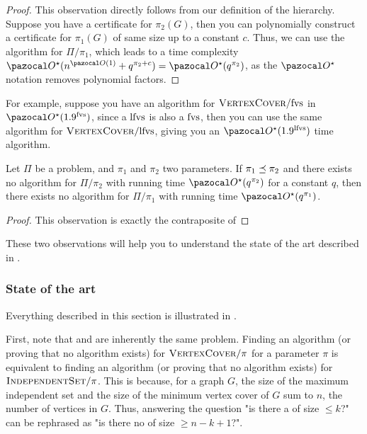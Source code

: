 \begin{proof}
    This observation directly follows from our definition of the hierarchy. Suppose you have a certificate for $\pi_2(G)$, then you can polynomially construct a certificate for $\pi_1(G)$ of same size up to a constant $c$. Thus, we can use the algorithm for $\Pi/\pi_1$, which leads to a time complexity $\O^\star(n^{\O(1)} + q^{\pi_2 + c}) = \O^\star(q^{\pi_2})$, as the $\O^\star$ notation removes polynomial factors. 
\end{proof}

For example, suppose you have an algorithm for $\textsc{VertexCover}/\text{fvs}$ in $\O^\star(1.9^\fvs)$, since a $\text{lfvs}$ is also a $\text{fvs}$, then you can use the same algorithm for $\textsc{VertexCover}/\text{lfvs}$, giving you an $\O^\star(1.9^\lfvs)$ time algorithm.

\begin{observation}
    \label{obs:lower_bound}
    Let $\Pi$ be a problem, and $\pi_1$ and $\pi_2$ two parameters. If $\pi_1 \preceq \pi_2$ and there exists no algorithm for $\Pi/\pi_2$ with running time $\O^\star(q^{\pi_2})$ for a constant $q$, then there exists no algorithm for $\Pi/\pi_1$ with running time $\O^\star(q^{\pi_1})$.
\end{observation}

\begin{proof}
    This observation is exactly the contraposite of 
\end{proof}

\medskip

These two observations will help you to understand the state of the art described in .

\subsubsection*{State of the art}



Everything described in this section is illustrated in .

\medskip

First, note that  and  are inherently the same problem. Finding an algorithm (or proving that no algorithm exists) for $\textsc{VertexCover}/\pi$ for a parameter $\pi$ is equivalent to finding an algorithm (or proving that no algorithm exists) for $\textsc{IndependentSet}/\pi$. This is because, for a graph $G$, the size of the maximum independent set and the size of the minimum vertex cover of $G$ sum to $n$, the number of vertices in $G$. Thus, answering the question "is there a  of size $\leq k$?" can be rephrased as "is there no  of size $\geq n - k + 1$?".

